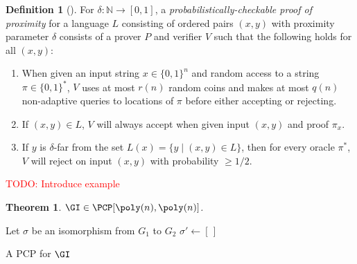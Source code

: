 \documentclass[english,12pt]{reedthesis}
\theoremstyle{plain}
\newtheorem{thm}{Theorem}[section]
\theoremstyle{definition}
\newtheorem{defn}[defn]{Definition}
\theoremstyle{remark}
\DeclarePairedDelimiter{\abs}{\lvert}{\rvert}
\newcommand{\TODO}[1]{\textcolor{red}{TODO: #1}}
\begin{document}
\begin{defn}[{\cite[Def.\ 2.2]{GOS25}}]\label{def:pcpp}
  For $\delta\colon \mathbb{N} \rightarrow [0, 1]$, a \emph{probabilistically-checkable proof of
    proximity} for a language $L$ consisting of ordered pairs $(x, y)$ with
  proximity parameter $\delta$ consists of a prover $P$ and verifier $V$ such that
  the following holds for all $(x, y)$:
  \begin{enumerate}
    \item When given an input string $x \in \{0, 1\}^{n}$ and random access to a
          string $\pi \in \{0, 1\}^{*}$, $V$ uses at most $r(n)$ random coins and
          makes at most $q(n)$ non-adaptive queries to locations of $\pi$ before
          either accepting or rejecting.
    \item If $(x, y) \in L$, $V$ will always accept when given input $(x, y)$ and
          proof $\pi_{x}$.
    \item If $y$ is $\delta$-far from the set $L(x) = \{y \mid (x, y) \in L\}$, then for
          every oracle $\pi^{*}$, $V$ will reject on input $(x, y)$ with
          probability $\ge 1/2$.
  \end{enumerate}
\end{defn}

\TODO{Introduce example}

\begin{thm}
  $\GI \in \PCP[\poly(n), \poly(n)]$.
\end{thm}

\begin{algorithm}[htbp]
  Let $\sigma$ be an isomorphism from $G_{1}$ to $G_{2}$\;
  \KwRet{$(\sigma, \sigma, \sigma)$}\;
  $\sigma' \leftarrow [\,]$\;
  \caption{A PCP for $\GI$}\label{alg:gi-pcp}
\end{algorithm}
\end{document}

